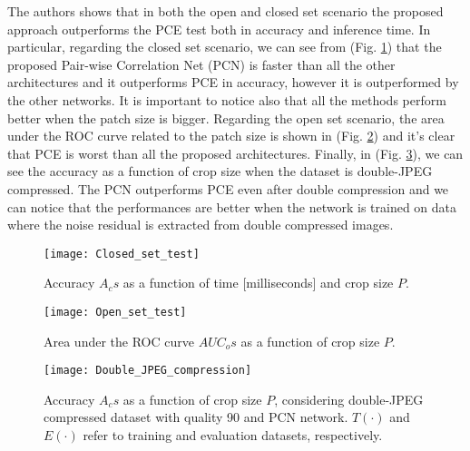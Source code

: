 The authors shows that in both the open and closed set scenario the proposed approach outperforms the PCE test both in accuracy 
and inference time. In particular, regarding the closed set scenario, we can see from (Fig. \ref{fig:Closed_set_test}) 
that the proposed Pair-wise Correlation Net (PCN) is faster than all the 
other architectures and it outperforms PCE in accuracy, however it is outperformed by the other networks. It is important to notice 
also that all the methods perform better when the patch size is bigger.
Regarding the open set scenario, the area under the ROC curve related to the patch size is shown in (Fig. \ref{fig:Open_set_test})  and it's clear that 
PCE is worst than all the proposed architectures. 
Finally, in (Fig. \ref{fig:Double_JPEG_compression}), we can see the accuracy as a function of crop size when the dataset is double-JPEG compressed. 
The PCN outperforms PCE even after double compression and we can notice that the performances are better when the network is trained on 
data where the noise residual is extracted from double compressed images.

\begin{figure}[t!]
    \centering
    \texttt{[image: Closed\_set\_test]}
    \caption{Accuracy $A_cs$ as a function of time [milliseconds] and crop size $P$.}
    \label{fig:Closed_set_test}
\end{figure}

\begin{figure}[t!]
    \centering
    \texttt{[image: Open\_set\_test]}
    \caption{Area under the ROC curve $AUC_os$ as a function of crop size $P$.}
    \label{fig:Open_set_test}
\end{figure}

\begin{figure}[t!]
    \centering
    \texttt{[image: Double\_JPEG\_compression]}
    \caption{Accuracy $A_cs$ as a function of crop size $P$, considering double-JPEG
    compressed dataset with quality 90 and PCN network. $T(·)$ and $E(·)$ refer
    to training and evaluation datasets, respectively.}
    \label{fig:Double_JPEG_compression}
\end{figure}